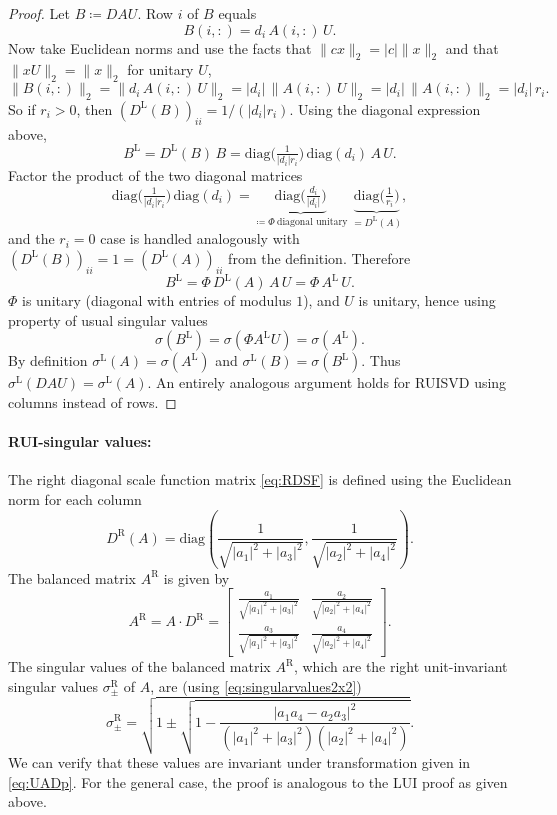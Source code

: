 \documentclass[11pt,a4paper]{article}
\newcommand{\be}{\begin{equation}}
\newcommand{\ee}{\end{equation}}
\begin{document}
\begin{proof}
Let \(B\coloneq DAU\). Row \(i\) of \(B\) equals
\be
B(i,:)=d_i\,A(i,:)\,U.
\ee
Now take Euclidean norms and use the facts that \(\|c x\|_2=|c|\|x\|_2\) and that \(\|xU\|_2=\|x\|_2\) for unitary \(U\),
\be
\|B(i,:)\|_2=\|d_i\,A(i,:)\,U\|_2
=|d_i|\,\|A(i,:)\,U\|_2
=|d_i|\,\|A(i,:)\|_2
=|d_i|\,r_i.
\ee
So if \(r_i>0\), then \((D^{\mathrm L}(B))_{ii}=1/(|d_i|r_i)\). Using the diagonal expression above,
\be
B^{\mathrm L}=D^{\mathrm L}(B)\,B
=\mathrm{diag}\Big(\tfrac{1}{|d_i|r_i}\Big)\,\mathrm{diag}(d_i)\,A\,U.
\ee
Factor the product of the two diagonal matrices
\be
\mathrm{diag}\Big(\tfrac{1}{|d_i|r_i}\Big)\,\mathrm{diag}(d_i)
=
\underbrace{\mathrm{diag}\Big(\tfrac{d_i}{|d_i|}\Big)}_{\coloneq \Phi\ \text{diagonal unitary}}
\;\underbrace{\mathrm{diag}\Big(\tfrac{1}{r_i}\Big)}_{=D^{\mathrm L}(A)},
\ee
and the \(r_i=0\) case is handled analogously with \((D^{\mathrm L}(B))_{ii}=1=(D^{\mathrm L}(A))_{ii}\) from the definition. Therefore
\be
B^{\mathrm L}=\Phi\,D^{\mathrm L}(A)\,A\,U=\Phi\,A^{\mathrm L}\,U.
\ee
\(\Phi\) is unitary (diagonal with entries of modulus \(1\)), and \(U\) is unitary, hence using property of usual singular values
\be
\sigma(B^{\mathrm L})=\sigma(\Phi A^{\mathrm L}U)=\sigma(A^{\mathrm L}).
\ee
By definition \(\sigma^{\mathrm L}(A)=\sigma(A^{\mathrm L})\) and \(\sigma^{\mathrm L}(B)=\sigma(B^{\mathrm L})\). Thus \(\sigma^{\mathrm L}(DAU)=\sigma^{\mathrm L}(A)\). An entirely analogous argument holds for RUISVD using columns instead of rows.
\end{proof}
\paragraph{RUI-singular values:} The right diagonal scale function matrix \cref{eq:RDSF} is defined using the Euclidean norm for each column
\begin{equation}
D^\mathrm{R}{(A)} = \text{diag} \left( \frac{1}{\sqrt{|a_1|^2 + |a_3|^2}}, \frac{1}{\sqrt{|a_2|^2 + |a_4|^2}} \right).
\end{equation}
The balanced matrix \( A^\mathrm{R} \) is given by
\begin{equation}
A^\mathrm{R} = A \cdot D^\mathrm{R} = 
\begin{bmatrix} 
\frac{a_1}{\sqrt{|a_1|^2 + |a_3|^2}} & \frac{a_2}{\sqrt{|a_2|^2 + |a_4|^2}} \\
\frac{a_3}{\sqrt{|a_1|^2 + |a_3|^2}} & \frac{a_4}{\sqrt{|a_2|^2 + |a_4|^2}}
\end{bmatrix}.
\end{equation}
The singular values of the balanced matrix \( A^\mathrm{R} \), which are the right unit-invariant singular values \( \sigma^\mathrm{R}_{\pm} \) of \( A \), are (using \cref{eq:singularvalues2x2})
\begin{equation}\label{eq:rui-2x2}
\sigma^\mathrm{R}_{\pm} = \sqrt{ 1 \pm \sqrt{1 - \frac{|a_1a_4 - a_2a_3|^2}{(|a_1|^2 + |a_3|^2)(|a_2|^2 + |a_4|^2)}}}.
\end{equation}
We can verify that these values are invariant under transformation given in \cref{eq:UADp}. For the general case, the proof is analogous to the LUI proof as given above.
\end{document}
